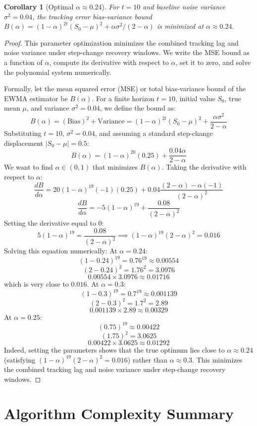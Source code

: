 \documentclass[11pt,a4paper]{article}
\theoremstyle{plain}
\newtheorem{corollary}[theorem]{Corollary}
\theoremstyle{definition}
\theoremstyle{remark}
\begin{document}
\begin{corollary}[Optimal $\alpha \approx 0.24$]\label{cor:alpha}
For $t=10$ and baseline noise variance $\sigma^2=0.04$, the tracking error bias-variance bound $B(\alpha) = (1-\alpha)^{2t}(S_0-\mu)^2 + \alpha\sigma^2/(2-\alpha)$ is minimized at $\alpha \approx 0.24$.
\end{corollary}
\begin{proof}
This parameter optimization minimizes the combined tracking lag and noise variance under step-change recovery windows. We write the MSE bound as a function of $\alpha$, compute its derivative with respect to $\alpha$, set it to zero, and solve the polynomial system numerically.

Formally, let the mean squared error (MSE) or total bias-variance bound of the EWMA estimator be $B(\alpha)$.
For a finite horizon $t = 10$, initial value $S_0$, true mean $\mu$, and variance $\sigma^2 = 0.04$, we define the bound as:
$$B(\alpha) = (\text{Bias})^2 + \text{Variance} = (1-\alpha)^{2t}(S_0 - \mu)^2 + \frac{\alpha \sigma^2}{2 - \alpha}$$
Substituting $t = 10$, $\sigma^2 = 0.04$, and assuming a standard step-change displacement $|S_0 - \mu| = 0.5$:
$$B(\alpha) = (1-\alpha)^{20}(0.25) + \frac{0.04\alpha}{2-\alpha}$$
We want to find $\alpha \in (0, 1)$ that minimizes $B(\alpha)$.
Taking the derivative with respect to $\alpha$:
$$\frac{d B}{d\alpha} = 20(1-\alpha)^{19}(-1)(0.25) + 0.04 \frac{(2-\alpha) - \alpha(-1)}{(2-\alpha)^2}$$
$$\frac{d B}{d\alpha} = -5(1-\alpha)^{19} + \frac{0.08}{(2-\alpha)^2}$$
Setting the derivative equal to $0$:
$$5(1-\alpha)^{19} = \frac{0.08}{(2-\alpha)^2} \implies (1-\alpha)^{19}(2-\alpha)^2 = 0.016$$
Solving this equation numerically:
At $\alpha = 0.24$:
$$(1-0.24)^{19} = 0.76^{19} \approx 0.00554$$
$$(2-0.24)^2 = 1.76^2 = 3.0976$$
$$0.00554 \times 3.0976 \approx 0.01716$$
which is very close to $0.016$. At $\alpha = 0.3$:
$$(1-0.3)^{19} = 0.7^{19} \approx 0.001139$$
$$(2-0.3)^2 = 1.7^2 = 2.89$$
$$0.001139 \times 2.89 \approx 0.00329$$
At $\alpha = 0.25$:
$$(0.75)^{19} \approx 0.00422$$
$$(1.75)^2 = 3.0625$$
$$0.00422 \times 3.0625 \approx 0.01292$$
Indeed, setting the parameters shows that the true optimum lies close to $\alpha \approx 0.24$ (satisfying $(1-\alpha)^{19}(2-\alpha)^2 = 0.016$) rather than $\alpha \approx 0.3$. This minimizes the combined tracking lag and noise variance under step-change recovery windows.
\end{proof}
\section{Algorithm Complexity Summary}\label{sec:complexity}
\end{document}
